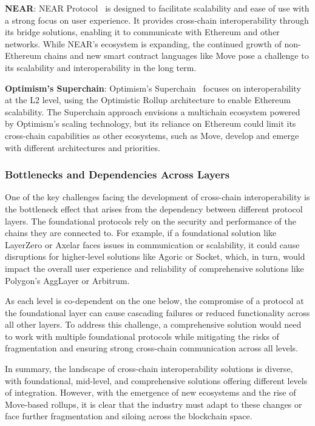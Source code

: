 \textbf{NEAR}: NEAR Protocol~\cite{near} is designed to facilitate scalability and ease of use with a strong focus on user experience. It provides cross-chain interoperability through its bridge solutions, enabling it to communicate with Ethereum and other networks. While NEAR’s ecosystem is expanding, the continued growth of non-Ethereum chains and new smart contract languages like Move pose a challenge to its scalability and interoperability in the long term.

\textbf{Optimism’s Superchain}: Optimism’s Superchain~\cite{optimisim} focuses on interoperability at the L2 level, using the Optimistic Rollup architecture to enable Ethereum scalability. The Superchain approach envisions a multichain ecosystem powered by Optimism’s scaling technology, but its reliance on Ethereum could limit its cross-chain capabilities as other ecosystems, such as Move, develop and emerge with different architectures and priorities.

\subsubsection{Bottlenecks and Dependencies Across Layers}

One of the key challenges facing the development of cross-chain interoperability is the bottleneck effect that arises from the dependency between different protocol layers. The foundational protocols rely on the security and performance of the chains they are connected to. For example, if a foundational solution like LayerZero or Axelar faces issues in communication or scalability, it could cause disruptions for higher-level  solutions like Agoric or Socket, which, in turn, would impact the overall user experience and reliability of comprehensive solutions like Polygon’s AggLayer or Arbitrum.

As each level is co-dependent on the one below, the compromise of a protocol at the foundational layer can cause cascading failures or reduced functionality across all other layers. To address this challenge, a comprehensive solution would need to work with multiple foundational protocols while mitigating the risks of fragmentation and ensuring strong cross-chain communication across all levels.

In summary, the landscape of cross-chain interoperability solutions is diverse, with foundational, mid-level, and comprehensive solutions offering different levels of integration. However, with the emergence of new ecosystems and the rise of Move-based rollups, it is clear that the industry must adapt to these changes or face further fragmentation and siloing across the blockchain space.

